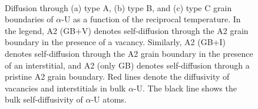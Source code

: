 \documentclass[review]{elsarticle}
\providecommand{\DIFaddbeginFL}{} %
\providecommand{\DIFaddendFL}{} %
\providecommand{\DIFdelbeginFL}{} %
\providecommand{\DIFdelendFL}{} %
\newcommand{\DIFscaledelfig}{0.5}
\newlength{\DIFdelgraphicswidth} %
\newlength{\DIFdelgraphicsheight} %
\newcommand{\DIFaddincludegraphics}[2][]{{\color{blue}\fbox{\DIFOincludegraphics[#1]{#2}}}} %
\newcommand{\DIFdelincludegraphics}[2][]{%
\sbox{\DIFdelgraphicsbox}{\DIFOincludegraphics[#1]{#2}}%
\settoboxwidth{\DIFdelgraphicswidth}{\DIFdelgraphicsbox} %
\settoboxtotalheight{\DIFdelgraphicsheight}{\DIFdelgraphicsbox} %
\scalebox{\DIFscaledelfig}{%
\parbox[b]{\DIFdelgraphicswidth}{\usebox{\DIFdelgraphicsbox}\\[-\baselineskip] \rule{\DIFdelgraphicswidth}{0em}}\llap{\resizebox{\DIFdelgraphicswidth}{\DIFdelgraphicsheight}{%
\setlength{\unitlength}{\DIFdelgraphicswidth}%
\begin{picture}(1,1)%
\thicklines\linethickness{2pt} %
{\color[rgb]{1,0,0}\put(0,0){\framebox(1,1){}}}%
{\color[rgb]{1,0,0}\put(0,0){\line( 1,1){1}}}%
{\color[rgb]{1,0,0}\put(0,1){\line(1,-1){1}}}%
\end{picture}%
}\hspace*{3pt}}} %
} %
\DeclareRobustCommand{\DIFaddbeginFL}{\DIFOaddbeginFL \let\includegraphics\DIFaddincludegraphics} %
\DeclareRobustCommand{\DIFaddendFL}{\DIFOaddendFL \let\includegraphics\DIFOincludegraphics} %
\DeclareRobustCommand{\DIFdelbeginFL}{\DIFOdelbeginFL \let\includegraphics\DIFdelincludegraphics} %
\DeclareRobustCommand{\DIFdelendFL}{\DIFOaddendFL \let\includegraphics\DIFOincludegraphics} %
\begin{document}
\begin{figure}[h!]
\centering
\DIFdelbeginFL %
\DIFdelendFL \DIFaddbeginFL {}
\DIFaddendFL \\
\caption{Diffusion through (a) type A, (b) type B, and (c) type C grain boundaries of $\alpha$-U as a function of the reciprocal temperature. In the legend, A2 (GB+V) denotes self-diffusion through the A2 grain boundary in the presence of a vacancy. Similarly, A2 (GB+I) denotes self-diffusion through the A2 grain boundary in the presence of an interstitial, and A2 (only GB) denotes self-diffusion through a pristine A2 grain boundary. Red lines denote the diffusivity of vacancies and interstitials in bulk $\alpha$-U. The black line shows the bulk self-diffusivity of $\alpha$-U atoms.}
\label{fig:Dif}
\end{figure}
\end{document}
